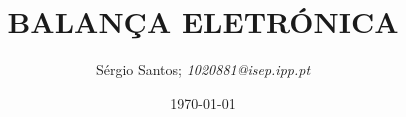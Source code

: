 \title{BALANÇA ELETRÓNICA}
\author{
\begin{minipage}{\linewidth}
		Sérgio Santos; \textit{1020881@isep.ipp.pt}
\end{minipage}
}
\date{\today}
